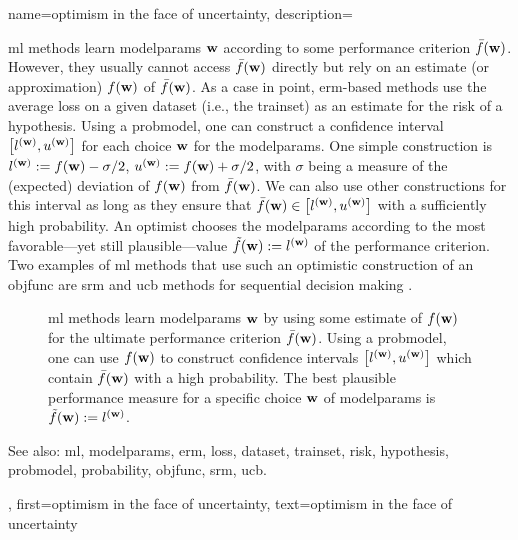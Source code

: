 {name={optimism in the face of uncertainty},
	description={\gls{ml} methods learn \gls{modelparams} ${\bf w}$ 
		according to some performance criterion $\bar{f}({\bf w})$. However, they usually 
		cannot access $\bar{f}({\bf w})$ directly but rely on an estimate (or approximation) 
		$f({\bf w})$ of $\bar{f}({\bf w})$. As a case in point, \gls{erm}-based methods use 
		the average \gls{loss} on a given \gls{dataset} (i.e., the \gls{trainset}) as an estimate 
		for the \gls{risk} of a \gls{hypothesis}. Using a \gls{probmodel}, one can construct 
		a confidence interval 
		$\big[ l^{({\bf w})},  u^{({\bf w})} \big]$ for each choice ${\bf w}$ for the \gls{modelparams}.
		One simple construction is $l^{({\bf w})} := f({\bf w}) - \sigma/2$, $u^{({\bf w})} := f({\bf w})+ \sigma/2$, 
	    	with $\sigma$ being a measure of the (expected) deviation of $f({\bf w})$ from $\bar{f}({\bf w})$.
		We can also use other constructions for this interval as long as they ensure that $\bar{f}({\bf w}) \in\big[ l^{({\bf w})},  u^{({\bf w})} \big]$ 
		with a sufficiently high \gls{probability}. An optimist chooses the \gls{modelparams} 
		according to the most favorable—yet still plausible—value $\tilde{f}({\bf w}) :=  l^{({\bf w})}$ 
		of the performance criterion. Two examples of \gls{ml} methods that use such an optimistic 
		construction of an \gls{objfunc} are \gls{srm} \cite[Ch. 11]{ShalevMLBook} and \gls{ucb} methods 
		for sequential decision making \cite[Sec. 2.2]{Bubeck2012}. 
		\begin{figure}[H]
				\begin{center}
\caption{\gls{ml} methods learn \gls{modelparams} ${\bf w}$ by using some estimate of $f({\bf w})$ for 
	the ultimate performance criterion $\bar{f}({\bf w})$. Using a \gls{probmodel}, one can use $f({\bf w})$ to 
	construct confidence intervals $\big[ l^{({\bf w})},  u^{({\bf w})} \big]$ which contain $\bar{f}({\bf w})$  
	with a high probability. The best plausible performance measure for a specific choice ${\bf w}$ of \gls{modelparams} 
	is $\tilde{f}({\bf w}) := l^{({\bf w})}$.} 
	\end{center}
		\end{figure}
		See also: \gls{ml}, \gls{modelparams}, \gls{erm}, \gls{loss}, \gls{dataset}, \gls{trainset}, \gls{risk}, \gls{hypothesis}, \gls{probmodel}, \gls{probability}, \gls{objfunc}, \gls{srm}, \gls{ucb}.},
	first={optimism in the face of uncertainty},
	text={optimism in the face of uncertainty} 
}

